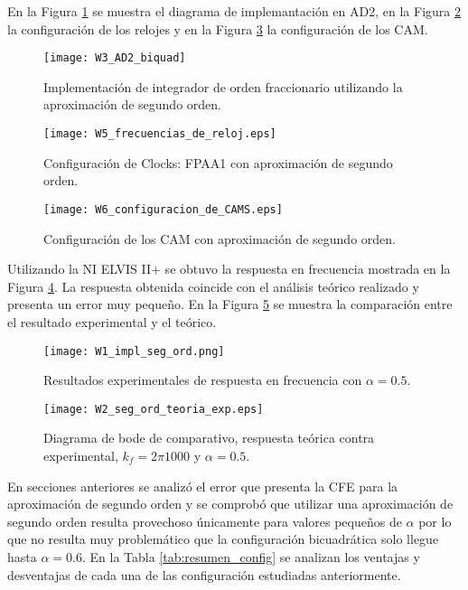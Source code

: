 	En la Figura \ref{fig:W3_AD2_biquad} se muestra el diagrama de implemantación en AD2, en la Figura \ref{fig:W5_frecuencias_de_reloj} la configuración de los relojes y en la Figura \ref{fig:W6_configuracion_de_CAMS} la configuración de los CAM.
	\begin{figure}[!ht] 
		\caption{Implementación de integrador de orden fraccionario utilizando la aproximación de segundo orden.}
		\label{fig:W3_AD2_biquad}
		\centering
		\texttt{[image: W3\_AD2\_biquad]}
	\end{figure}
	
	\begin{figure}[!ht] 
		\caption{Configuración de Clocks: FPAA1 con aproximación de segundo orden.}
		\label{fig:W5_frecuencias_de_reloj}
		\centering
		\texttt{[image: W5\_frecuencias\_de\_reloj.eps]}
	\end{figure}
	
	\begin{figure}[!ht] 
		\caption{Configuración de los CAM con aproximación de segundo orden.}
		\label{fig:W6_configuracion_de_CAMS}
		\centering
		\texttt{[image: W6\_configuracion\_de\_CAMS.eps]}
	\end{figure}
	
	Utilizando la NI ELVIS II+ se obtuvo la respuesta en frecuencia mostrada en la Figura \ref{fig:W1_impl_seg_ord}. La respuesta obtenida coincide con el análisis teórico realizado y presenta un error muy pequeño. En la Figura \ref{fig:W2_seg_ord_teoria_exp} se muestra la comparación entre el resultado experimental y el teórico.
	\begin{figure}[!ht] 
		\caption{Resultados experimentales de respuesta en frecuencia con $\alpha = 0.5$.}
		\label{fig:W1_impl_seg_ord}
		\centering
		\texttt{[image: W1\_impl\_seg\_ord.png]}
	\end{figure}
	
	\begin{figure}[!ht]
		\caption{Diagrama de bode de comparativo, respuesta teórica contra experimental,  $k_{f} = 2\pi 1000$ y  $\alpha = 0.5$.} 
		\label{fig:W2_seg_ord_teoria_exp}
		\centering
		\texttt{[image: W2\_seg\_ord\_teoria\_exp.eps]}
	\end{figure}
	
	En secciones anteriores se analizó el error que presenta la CFE para la aproximación de segundo orden y se comprobó que utilizar una aproximación de segundo orden resulta provechoso únicamente para valores pequeños de $\alpha$ por lo que no resulta muy problemático que la configuración bicuadrática solo llegue hasta $\alpha = 0.6$. En la Tabla \ref{tab:resumen_config} se analizan los ventajas y desventajas de cada una de las configuración estudiadas anteriormente.
	

